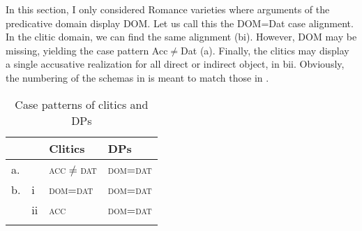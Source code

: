 \documentclass[output=paper,colorlinks,citecolor=brown,modfonts,nonflat]{langsci/langscibook}
\begin{document}
\largerpage[-1]
In this section, I only considered Romance varieties where arguments of the predicative domain display DOM. Let us call this the DOM=Dat case alignment. In the clitic domain, we can find the same alignment (bi). However, DOM may be missing, yielding the case pattern Acc${\neq}$Dat (a). Finally, the clitics may display a single accusative realization for all direct or indirect object, in bii. Obviously, the numbering of the schemas in  is meant to match those in .
%

\begin{table}
 \caption{\label{extab:manzini:30}Case patterns of clitics and DPs}
 \begin{tabular}{llll}
 \lsptoprule
    &    & Clitics        & DPs     \\
 \midrule
 a. &    & \textsc{acc}${\neq}$\textsc{dat} & \textsc{dom}=\textsc{dat} \\
 b. & i  & \textsc{dom}=\textsc{dat}       & \textsc{dom}=\textsc{dat} \\
    & ii & \textsc{acc}            & \textsc{dom}=\textsc{dat} \\
 \lspbottomrule
 \end{tabular}
 \end{table}
\end{document}
